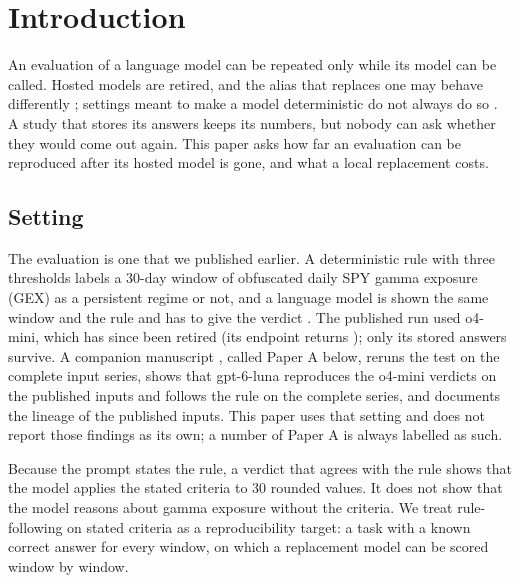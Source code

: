 \section{Introduction}
\label{sec:introduction}

An evaluation of a language model can be repeated only while its model can be called. Hosted models are retired, and the alias that replaces one may behave differently \cite{chen2024chatgpt}; settings meant to make a model deterministic do not always do so \cite{atil2025nondeterminism}. A study that stores its answers keeps its numbers, but nobody can ask whether they would come out again. This paper asks how far an evaluation can be reproduced after its hosted model is gone, and what a local replacement costs.

\subsection{Setting}
\label{sec:introduction:setting}

The evaluation is one that we published earlier. A deterministic rule with three thresholds labels a 30-day window of obfuscated daily SPY gamma exposure (GEX) as a persistent regime or not, and a language model is shown the same window and the rule and has to give the verdict \cite{regan2025obfuscation,regan2026regimes,regan2026jrfm}. The published run used o4-mini, which has since been retired (its endpoint returns ); only its stored answers survive. A companion manuscript \cite{regan2026rerun}, called Paper A below, reruns the test on the complete input series, shows that gpt-6-luna reproduces the o4-mini verdicts on the published inputs and follows the rule on the complete series, and documents the lineage of the published inputs. This paper uses that setting and does not report those findings as its own; a number of Paper A is always labelled as such.

Because the prompt states the rule, a verdict that agrees with the rule shows that the model applies the stated criteria to 30 rounded values. It does not show that the model reasons about gamma exposure without the criteria. We treat rule-following on stated criteria as a reproducibility target: a task with a known correct answer for every window, on which a replacement model can be scored window by window.

